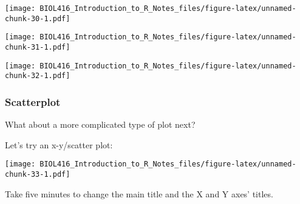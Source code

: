 \documentclass[]{article}
\newenvironment{Shaded}{\begin{snugshade}}{\end{snugshade}}
\newcommand{\KeywordTok}[1]{\textcolor[rgb]{0.13,0.29,0.53}{\textbf{#1}}}
\newcommand{\DataTypeTok}[1]{\textcolor[rgb]{0.13,0.29,0.53}{#1}}
\newcommand{\DecValTok}[1]{\textcolor[rgb]{0.00,0.00,0.81}{#1}}
\newcommand{\StringTok}[1]{\textcolor[rgb]{0.31,0.60,0.02}{#1}}
\newcommand{\OperatorTok}[1]{\textcolor[rgb]{0.81,0.36,0.00}{\textbf{#1}}}
\newcommand{\NormalTok}[1]{#1}
\begin{document}
\texttt{[image: BIOL416\_Introduction\_to\_R\_Notes\_files/figure-latex/unnamed-chunk-30-1.pdf]}

\begin{Shaded}
\end{Shaded}

\texttt{[image: BIOL416\_Introduction\_to\_R\_Notes\_files/figure-latex/unnamed-chunk-31-1.pdf]}

\begin{Shaded}
\end{Shaded}

\texttt{[image: BIOL416\_Introduction\_to\_R\_Notes\_files/figure-latex/unnamed-chunk-32-1.pdf]}

\subsubsection{Scatterplot}\label{scatterplot}

What about a more complicated type of plot next?

Let's try an x-y/scatter plot:

\begin{Shaded}
\end{Shaded}

\texttt{[image: BIOL416\_Introduction\_to\_R\_Notes\_files/figure-latex/unnamed-chunk-33-1.pdf]}

Take five minutes to change the main title and the X and Y axes' titles.
\end{document}
